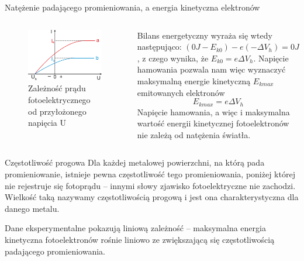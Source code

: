 \documentclass{cubeamer}
\begin{document}
	\begin{frame}{Natężenie padającego promieniowania, a energia kinetyczna elektronów}
		\begin{columns}
			\begin{column}{0.5\textwidth}
				\begin{figure}
					\centering
					\includegraphics[height=0.5\textheight]{img/rysunek_1.2.png}
					\caption{Zależność prądu fotoelektrycznego od przyłożonego napięcia U}
				\end{figure}
			\end{column}
			\begin{column}{0.6\textwidth}
				Bilans energetyczny wyraża się wtedy następująco:
				$(0J-E_{k0})-e(-\Delta V_{h})=0J$, z czego wynika, że
				$E_{k0}=e\Delta V_{h}$. Napięcie hamowania pozwala nam więc wyznaczyć maksymalną
				energie kinetyczną $E_{kmax}$ emitowanych elektronów
				\begin{equation*}
					E_{kmax}=e\Delta V_{h}
				\end{equation*}
				Napięcie hamowania, a więc i maksymalna wartość energii kinetycznej
				fotoelektronów nie zależą od natężenia światła.
			\end{column}
		\end{columns}
	\end{frame}

	\begin{frame}{Częstotliwość progowa}
		Dla każdej metalowej powierzchni, na którą pada promieniowanie, istnieje pewna
		częstotliwość tego promieniowania, poniżej której nie rejestruje się
		fotoprądu – innymi słowy zjawisko fotoelektryczne nie zachodzi. Wielkość taką
		nazywamy częstotliwością progową i jest ona charakterystyczna dla danego metalu.

		Dane eksperymentalne pokazują liniową zależność – maksymalna energia kinetyczna
		fotoelektronów rośnie liniowo ze zwiększającą się częstotliwością padającego
		promieniowania.
	\end{frame}
\end{document}
